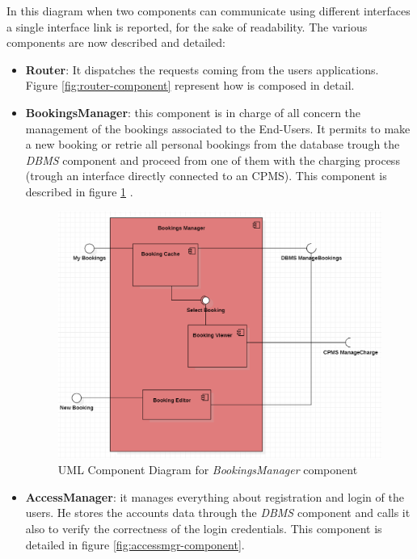 \documentclass[a4paper]{report}
\begin{document}
In this diagram when two components can communicate using different interfaces a single interface link is 
reported, for the sake of readability. The various components are now described and detailed:
\begin{itemize}
\item \textbf{Router}: It dispatches the requests coming from the users applications.  Figure \ref{fig:router-component} represent how is composed in detail.

\item \textbf{BookingsManager}: this component is in charge of all concern the management of the bookings associated to the End-Users. It permits to make a new booking or retrie all personal bookings from the database trough the \textit{DBMS} component and proceed from one of them with the charging process (trough an interface directly connected to an CPMS). This component is described in figure \ref{fig:bookingsmgr-component} .


\begin{figure}[htp]
\includegraphics[scale=0.6]{img/BOOKINGS MANAGER.png}
\caption{UML Component Diagram for \textit{BookingsManager} component}
\label{fig:bookingsmgr-component}
\end{figure}

\item \textbf{AccessManager}: it manages everything about registration and login of the users. He stores the accounts data through the \textit{DBMS} component and calls it also to verify the correctness of the login credentials. This component is detailed in figure \ref{fig:accessmgr-component}.


\end{itemize}
\end{document}
